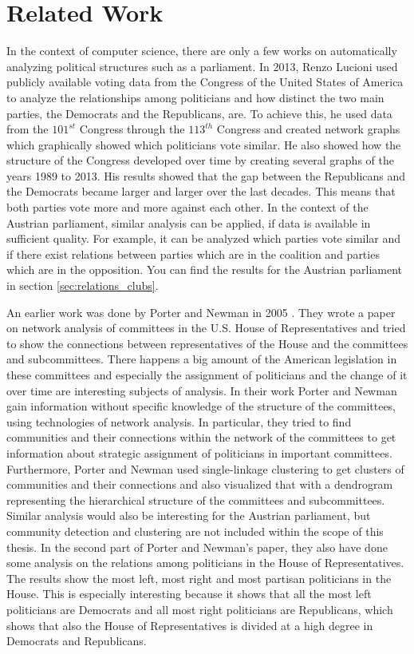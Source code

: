 \chapter{Related Work}
\label{chap:relatedwork}

In the context of computer science, there are only a few works on automatically analyzing political structures such as a parliament. In 2013, Renzo Lucioni \cite{Lucioni_2015} used publicly available voting data from the Congress of the United States of America to analyze the relationships among politicians and how distinct the two main parties, the Democrats and the Republicans, are. To achieve this, he used data from the $101^{st}$ Congress through the $113^{th}$ Congress and created network graphs which graphically showed which politicians vote similar. He also showed how the structure of the Congress developed over time by creating several graphs of the years 1989 to 2013. His results showed that the gap between the Republicans and the Democrats became larger and larger over the last decades. This means that both parties vote more and more against each other. In the context of the Austrian parliament, similar analysis can be applied, if data is available in sufficient quality. For example, it can be analyzed which parties vote similar and if there exist relations between parties which are in the coalition and parties which are in the opposition. You can find the results for the Austrian parliament in section \ref{sec:relations_clubs}.

An earlier work was done by Porter and Newman in 2005 \cite{Porter_2005}. They wrote a paper on network analysis of committees in the U.S. House of Representatives and tried to show the connections between representatives of the House and the committees and subcommittees. There happens a big amount of the American legislation in these committees and especially the assignment of politicians and the change of it over time are interesting subjects of analysis. In their work Porter and Newman gain information without specific knowledge of the structure of the committees, using technologies of network analysis. In particular, they tried to find communities and their connections within the network of the committees to get information about strategic assignment of politicians in important committees. Furthermore, Porter and Newman used single-linkage clustering to get clusters of communities and their connections and also visualized that with a dendrogram representing the hierarchical structure of the committees and subcommittees. Similar analysis would also be interesting for the Austrian parliament, but community detection and clustering are not included within the scope of this thesis. In the second part of Porter and Newman's paper, they also have done some analysis on the relations among politicians in the House of Representatives. The results show the most left, most right and most partisan politicians in the House. This is especially interesting because it shows that all the most left politicians are Democrats and all most right politicians are Republicans, which shows that also the House of Representatives is divided at a high degree in Democrats and Republicans.

